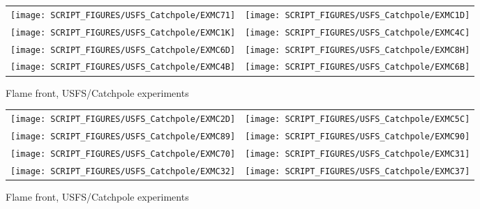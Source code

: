 \begin{figure}[p]
\begin{tabular*}{\textwidth}{l@{\extracolsep{\fill}}r}
\texttt{[image: SCRIPT\_FIGURES/USFS\_Catchpole/EXMC71]} &
\texttt{[image: SCRIPT\_FIGURES/USFS\_Catchpole/EXMC1D]} \\
\texttt{[image: SCRIPT\_FIGURES/USFS\_Catchpole/EXMC1K]} &
\texttt{[image: SCRIPT\_FIGURES/USFS\_Catchpole/EXMC4C]} \\
\texttt{[image: SCRIPT\_FIGURES/USFS\_Catchpole/EXMC6D]} &
\texttt{[image: SCRIPT\_FIGURES/USFS\_Catchpole/EXMC8H]} \\
\texttt{[image: SCRIPT\_FIGURES/USFS\_Catchpole/EXMC4B]} &
\texttt{[image: SCRIPT\_FIGURES/USFS\_Catchpole/EXMC6B]} \\
\end{tabular*}
\caption[Flame front, USFS/Catchpole experiments]{Flame front, USFS/Catchpole experiments}
\label{USFS_Catchpole_328}
\end{figure}

\begin{figure}[p]
\begin{tabular*}{\textwidth}{l@{\extracolsep{\fill}}r}
\texttt{[image: SCRIPT\_FIGURES/USFS\_Catchpole/EXMC2D]} &
\texttt{[image: SCRIPT\_FIGURES/USFS\_Catchpole/EXMC5C]} \\
\texttt{[image: SCRIPT\_FIGURES/USFS\_Catchpole/EXMC89]} &
\texttt{[image: SCRIPT\_FIGURES/USFS\_Catchpole/EXMC90]} \\
\texttt{[image: SCRIPT\_FIGURES/USFS\_Catchpole/EXMC70]} &
\texttt{[image: SCRIPT\_FIGURES/USFS\_Catchpole/EXMC31]} \\
\texttt{[image: SCRIPT\_FIGURES/USFS\_Catchpole/EXMC32]} &
\texttt{[image: SCRIPT\_FIGURES/USFS\_Catchpole/EXMC37]} \\
\end{tabular*}
\caption[Flame front, USFS/Catchpole experiments]{Flame front, USFS/Catchpole experiments}
\label{USFS_Catchpole_336}
\end{figure}


